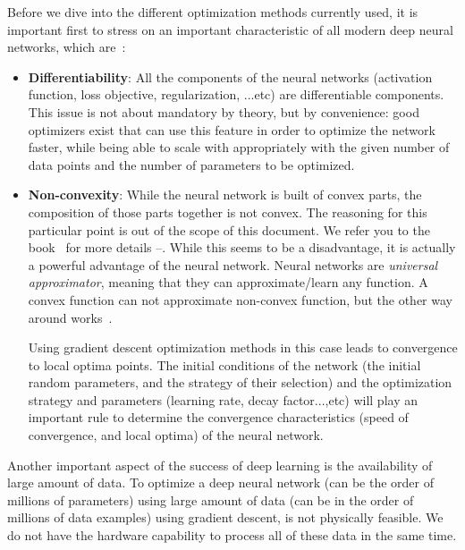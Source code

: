 Before we dive into the different optimization methods currently used, it is important first to stress on an important characteristic of all modern deep neural networks, which are~\citep{Goodfellow-et-al-2016}:
\begin{itemize}
    \item \textbf{Differentiability}: All the components of the neural networks (activation function, loss objective, regularization, ...etc) are differentiable components. This issue is not about mandatory by theory, but by convenience: good optimizers exist that can use this feature in order to optimize the network faster, while being able to scale with appropriately with the given number of data points and the number of parameters to be optimized.
    \item \textbf{Non-convexity}: While the neural network is built of convex parts, the composition of those parts together is not convex. The reasoning for this particular point is out of the scope of this document. We refer you to the book~\citep{Goodfellow-et-al-2016} for more details --. While this seems to be a disadvantage, it is actually a powerful advantage of the neural network. Neural networks are \textit{universal approximator}, meaning that they can approximate/learn any function. A convex function can not approximate non-convex function, but the other way around works~\citep{lecture_nn_optimization}.

    Using gradient descent optimization methods in this case leads to convergence to local optima points. The initial conditions of the network (the initial random parameters, and the strategy of their selection) and the optimization strategy and parameters (learning rate, decay factor...,etc) will play an important rule to determine the convergence characteristics (speed of convergence, and local optima) of the neural network.
\end{itemize}

\par Another important aspect of the success of deep learning is the availability of large amount of data. To optimize a deep neural network (can be the order of millions of parameters) using large amount of data (can be in the order of millions of data examples) using gradient descent, is not physically feasible. We do not have the hardware capability to process all of these data in the same time.

